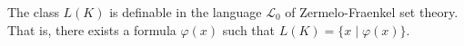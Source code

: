 The class $L(K)$ is definable in the language $\mathcal{L}_0$ of Zermelo-Fraenkel set theory. That is, there exists a formula $\varphi(x)$ such that $L(K) = \{x \mid \varphi(x)\}$.
